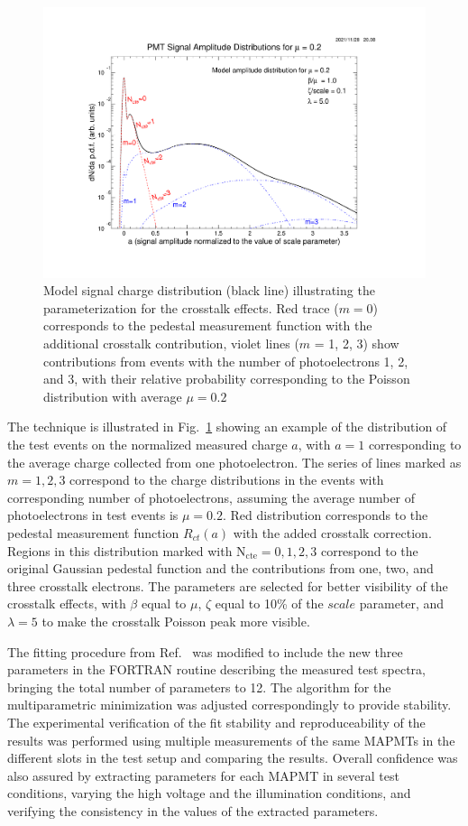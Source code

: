 \begin{figure}[hbt]
	\centering
	\includegraphics[width=0.98\linewidth, trim=80 55 105 105, clip]{figures/model.pdf}
	\caption{Model  signal  charge  distribution  (black  line)  illustrating  the parameterization for the crosstalk effects.  Red trace ($m=0$) corresponds to the pedestal measurement function with the additional crosstalk contribution, violet lines ($m$ = 1, 2, 3) show contributions from events with the number of photoelectrons 1, 2, and 3, with their relative probability corresponding to the Poisson distribution with average $\mu=0.2$}
	\label{fig:Model}
\end{figure}


The technique is illustrated in Fig.~\ref{fig:Model} showing an example of the distribution of the test events on the normalized measured charge $a$, with $a=1$ corresponding to the average charge collected from one photoelectron. The series of lines marked as $m = 1, 2, 3$ correspond to the charge distributions in the events with corresponding number of photoelectrons, assuming the average number of photoelectrons in test events is $\mu = 0.2$. Red distribution corresponds to the pedestal measurement function $R_{ct}(a)$ with the added crosstalk correction. Regions in this distribution marked with $\mathrm{N_{cte}=0, 1, 2, 3}$ correspond to the original Gaussian pedestal function and the contributions from one, two, and three crosstalk electrons. The parameters are selected for better visibility of the crosstalk effects, with $\beta$ equal to $\mu$, $\zeta$ equal to 10\% of the $scale$ parameter, and $\lambda = 5$ to make the crosstalk Poisson peak more visible.  

The fitting procedure from Ref.~\cite{DEGTIARENKO20171} was modified to include the new three parameters in the FORTRAN routine describing the measured test spectra, bringing the total number of parameters to 12. The algorithm for the multiparametric minimization was adjusted correspondingly to provide stability. The experimental verification of the fit stability and reproduceability of the results was performed using multiple measurements of the same MAPMTs in the different slots in the test setup and comparing the results. Overall confidence was also assured by extracting parameters for each MAPMT in several test conditions, varying the high voltage and the illumination conditions, and verifying the consistency in the values of the extracted parameters. 

